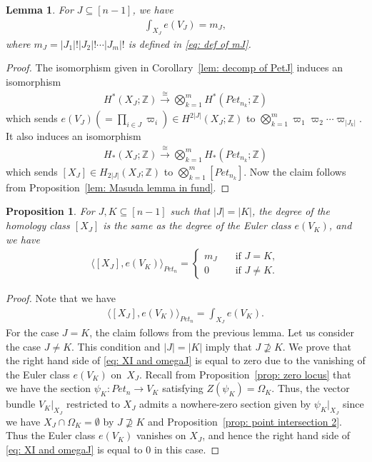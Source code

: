\documentclass[11pt]{article}
\newtheorem{lemma}[theo]{Lemma}
\newtheorem{prop}[theo]{Proposition}
\theoremstyle{definition}
\numberwithin{equation}{section}
\numberwithin{equation}{section}
\begin{document}
\begin{lemma}\label{lem: geometry of mJ}
For $J\subseteq[n-1]$, we have
\begin{align*}
\int_{X_{J}} e(V_J) = m_J , 
\end{align*}
where $m_J=|J_1| ! |J_2| ! \cdots |J_m| !$ is defined in \eqref{eq: def of mJ}.
\end{lemma}

\begin{proof}
The isomorphism given in Corollary~\ref{lem: decomp of PetJ} induces an isomorphism
\begin{align*}
H^*(X_J;{\mathbb Z}) \stackrel{\cong}{\rightarrow} \bigotimes_{k=1}^{m} H^*(Pet_{n_k};{\mathbb Z})
\end{align*}
which sends
$e(V_J)(=\prod_{i\in J}\varpi_i) \in H^{2|J|}(X_{J};{\mathbb Z})$ to $\bigotimes_{k=1}^{m} \varpi_1\varpi_2\cdots \varpi_{|J_k|}$. It also induces an isomorphism
\begin{align*}
H_*(X_J;{\mathbb Z}) \stackrel{\cong}{\rightarrow} \bigotimes_{k=1}^{m} H_*(Pet_{n_k};{\mathbb Z})
\end{align*}
which sends $[X_{J}]\in H_{2|J|}(X_J;{\mathbb Z})$ to $\bigotimes_{k=1}^{m}[Pet_{n_k}]$. Now the claim follows from Proposition~\ref{lem: Masuda lemma in fund}.
\end{proof}

\begin{prop}\label{prop: duality}
For $J,K\subseteq [n-1]$ such that $|J|=|K|$, the degree of the homology class $[X_{J}]$ is the same as the degree of the Euler class $e(V_K)$, 
and we have
\begin{align*} 
\langle [X_{J}] , e(V_K) \rangle_{Pet_{n}} 
=
\begin{cases}
m_J \quad &\text{if $J=K$}, \\
0 &\text{if $J\ne K$}.
\end{cases}
\end{align*}
\end{prop}

\begin{proof}
Note that we have 
\begin{equation}
\begin{split}\label{eq: XI and omegaJ}
\langle [X_{J}] , e(V_K) \rangle_{Pet_{n}} 
= \int_{X_{J}}  e(V_K).
\end{split}
\end{equation}
For the case $J=K$, the claim follows from the previous lemma. Let us consider the case $J\ne K$. This condition and $|J|= |K|$ imply that $J\not\supseteq K$. 
We prove that the right hand side of \eqref{eq: XI and omegaJ} is equal to zero due to the vanishing of the Euler class $e(V_K)$ on~$X_{J}$.
Recall from Proposition~\ref{prop: zero locus} that we have the section $\psi_{K}\colon Pet_{n} \rightarrow V_{K}$ satisfying $Z(\psi_K)=\Omega_K$. Thus, the vector bundle $V_{K}|_{X_J}$ restricted to $X_J$ admits a nowhere-zero section given by $\psi_K|_{X_J}$ since we have $X_J\cap\Omega_K=\emptyset$ by $J\not\supseteq K$ and Proposition~\ref{prop: point intersection 2}. Thus the Euler class $e(V_K)$ vanishes on $X_J$, and hence the right hand side of \eqref{eq: XI and omegaJ} is equal to $0$ in this case.
\end{proof}
\end{document}
